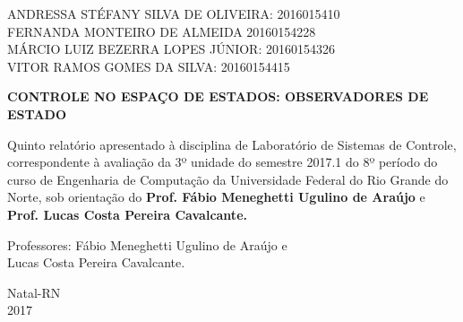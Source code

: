 \documentclass[a4paper,12pt]{article}
\begin{document}
\newpage


\thispagestyle{empty}

\begin{center}
\begin{normalsize}
ANDRESSA STÉFANY SILVA DE OLIVEIRA: 2016015410\\
\vspace{0.8cm}
FERNANDA MONTEIRO DE ALMEIDA 20160154228\\
\vspace{0.8cm}
MÁRCIO LUIZ BEZERRA LOPES JÚNIOR: 20160154326\\
\vspace{0.8cm}
VITOR RAMOS GOMES DA SILVA: 20160154415\\

\end{normalsize}
\end{center}
\vspace{3cm}

{\bf{\large {\centering CONTROLE NO ESPAÇO DE ESTADOS: OBSERVADORES DE ESTADO\\}}}

\vspace{4cm}

\begin{adjustwidth}{7.5cm}{0cm}

{\normalsize
Quinto relatório apresentado à disciplina de
Laboratório de Sistemas de Controle, correspondente à
avaliação da 3º unidade do semestre 2017.1 do 8º período
do curso de Engenharia de Computação da
Universidade Federal do Rio Grande do Norte, sob
orientação do {\bf Prof. Fábio Meneghetti Ugulino de
Araújo} e {\bf Prof. Lucas Costa Pereira Cavalcante.}

}

\end{adjustwidth}

\vspace{2cm}

\begin{center}

Professores:  Fábio Meneghetti Ugulino de Araújo e\\
Lucas Costa Pereira Cavalcante.

\vspace{2.5cm}

{\large Natal-RN\\
2017}

\end{center}
\end{document}
